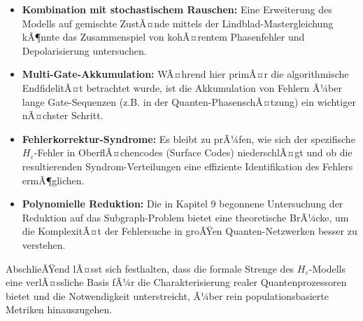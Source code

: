﻿\documentclass[11pt,a4paper]{article}
\theoremstyle{definition}
\newcommand{\Heps}{H_{\!\varepsilon}}
\begin{document}
\begin{itemize}[leftmargin=*]
    \item \textbf{Kombination mit stochastischem Rauschen:} Eine Erweiterung des Modells auf gemischte ZustÃ¤nde mittels der Lindblad-Mastergleichung kÃ¶nnte das Zusammenspiel von kohÃ¤rentem Phasenfehler und Depolarisierung untersuchen.
    \item \textbf{Multi-Gate-Akkumulation:} WÃ¤hrend hier primÃ¤r die algorithmische EndfidelitÃ¤t betrachtet wurde, ist die Akkumulation von Fehlern Ã¼ber lange Gate-Sequenzen (z.B. in der Quanten-PhasenschÃ¤tzung) ein wichtiger nÃ¤chster Schritt.
    \item \textbf{Fehlerkorrektur-Syndrome:} Es bleibt zu prÃ¼fen, wie sich der spezifische $\Heps$-Fehler in OberflÃ¤chencodes (Surface Codes) niederschlÃ¤gt und ob die resultierenden Syndrom-Verteilungen eine effiziente Identifikation des Fehlers ermÃ¶glichen.
    \item \textbf{Polynomielle Reduktion:} Die in Kapitel 9 begonnene Untersuchung der Reduktion auf das Subgraph-Problem bietet eine theoretische BrÃ¼cke, um die KomplexitÃ¤t der Fehlersuche in groÃŸen Quanten-Netzwerken besser zu verstehen.
\end{itemize}

AbschlieÃŸend lÃ¤sst sich festhalten, dass die formale Strenge des $\Heps$-Modells eine verlÃ¤ssliche Basis fÃ¼r die Charakterisierung realer Quantenprozessoren bietet und die Notwendigkeit unterstreicht, Ã¼ber rein populationsbasierte Metriken hinauszugehen.
\end{document}

